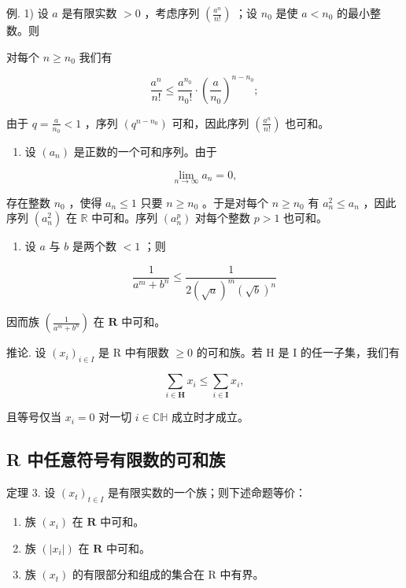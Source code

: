 例. 1) 设 \(a\) 是有限实数 \(>0\) ，考虑序列 \(\left(\frac{a^n}{n!}\right)\) ；设 \(n_0\) 是使 \(a < n_0\) 的最小整数。则

对每个 \(n \geqslant n_0\) 我们有

\[
\frac {a ^ {n}}{n !} \leqslant \frac {a ^ {n _ {0}}}{n _ {0} !} \cdot \left(\frac {a}{n _ {0}}\right) ^ {n - n _ {0}};
\]

由于 \(q = \frac{a}{n_0} < 1\) ，序列 \((q^{n - n_0})\) 可和，因此序列 \(\left(\frac{a^n}{n!}\right)\) 也可和。

\begin{enumerate}
\def\labelenumi{\arabic{enumi})}
\setcounter{enumi}{1}
\tightlist
\item
  设 \((a_{n})\) 是正数的一个可和序列。由于
\end{enumerate}

\[
\lim _ {n \rightarrow \infty} a _ {n} = 0,
\]

存在整数 \(n_0\) ，使得 \(a_n \leqslant 1\) 只要 \(n \geqslant n_0\) 。于是对每个 \(n \geqslant n_0\) 有 \(a_n^2 \leqslant a_n\) ，因此序列 \((a_n^2)\) 在 \(\mathbb{R}\) 中可和。序列 \((a_n^p)\) 对每个整数 \(p > 1\) 也可和。

\begin{enumerate}
\def\labelenumi{\arabic{enumi})}
\setcounter{enumi}{2}
\tightlist
\item
  设 \(a\) 与 \(b\) 是两个数 \(< 1\) ；则
\end{enumerate}

\[
\frac {1}{a ^ {m} + b ^ {n}} \leqslant \frac {1}{2 (\sqrt {a}) ^ {m} (\sqrt {b}) ^ {n}}
\]

因而族 \(\left(\frac{1}{a^m + b^n}\right)\) 在 \(\mathbf{R}\) 中可和。

推论. 设 \((x_{i})_{i\in I}\) 是 R 中有限数 \(\geqslant 0\) 的可和族。若 H 是 I 的任一子集，我们有

\[
\sum_ {i \in \mathbf {H}} x _ {i} \leqslant \sum_ {i \in \mathbf {I}} x _ {i},
\]

且等号仅当 \(x_{i} = 0\) 对一切 \(i \in \mathbb{C}\mathbb{H}\) 成立时才成立。

\subsection{R 中任意符号有限数的可和族}

定理 3. 设 \((x_{t})_{t\in I}\) 是有限实数的一个族；则下述命题等价：

\begin{enumerate}
\def\labelenumi{\alph{enumi})}
\item
  族 \((x_{i})\) 在 \(\mathbf{R}\) 中可和。
\item
  族 \((|x_{i}|)\) 在 \(\mathbf{R}\) 中可和。
\item
  族 \((x_{t})\) 的有限部分和组成的集合在 R 中有界。
\end{enumerate}


